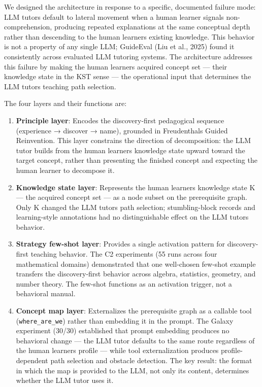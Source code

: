 \documentclass[
]{article}
\begin{document}
We designed the architecture in response to a specific, documented failure mode: LLM tutors default to lateral movement when a human learner signals non-comprehension, producing repeated explanations at the same conceptual depth rather than descending to the human learner\textquotesingle s existing knowledge. This behavior is not a property of any single LLM; GuideEval (Liu et al., 2025) found it consistently across evaluated LLM tutoring systems. The architecture addresses this failure by making the human learner\textquotesingle s acquired concept set --- their knowledge state in the KST sense --- the operational input that determines the LLM tutor\textquotesingle s teaching path selection.

The four layers and their functions are:

\begin{enumerate}
\def\labelenumi{\arabic{enumi}.}
\item
  \textbf{Principle layer}: Encodes the discovery-first pedagogical sequence (experience → discover → name), grounded in Freudenthal\textquotesingle s Guided Reinvention. This layer constrains the direction of decomposition: the LLM tutor builds from the human learner\textquotesingle s knowledge state upward toward the target concept, rather than presenting the finished concept and expecting the human learner to decompose it.
\item
  \textbf{Knowledge state layer}: Represents the human learner\textquotesingle s knowledge state K --- the acquired concept set --- as a node subset on the prerequisite graph. Only K changed the LLM tutor\textquotesingle s path selection; stumbling-block records and learning-style annotations had no distinguishable effect on the LLM tutor\textquotesingle s behavior.
\item
  \textbf{Strategy few-shot layer}: Provides a single activation pattern for discovery-first teaching behavior. The C2 experiments (55 runs across four mathematical domains) demonstrated that one well-chosen few-shot example transfers the discovery-first behavior across algebra, statistics, geometry, and number theory. The few-shot functions as an activation trigger, not a behavioral manual.
\item
  \textbf{Concept map layer}: Externalizes the prerequisite graph as a callable tool (\texttt{where\_are\_we}) rather than embedding it in the prompt. The Galaxy experiment (30/30) established that prompt embedding produces no behavioral change --- the LLM tutor defaults to the same route regardless of the human learner\textquotesingle s profile --- while tool externalization produces profile-dependent path selection and obstacle detection. The key result: the format in which the map is provided to the LLM, not only its content, determines whether the LLM tutor uses it.
\end{enumerate}
\end{document}
